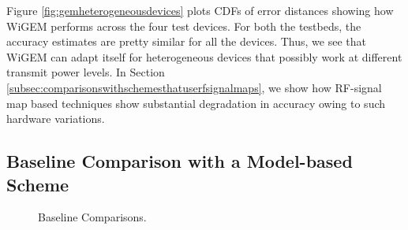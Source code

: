 
Figure \ref{fig:gemheterogeneousdevices} plots CDFs of error distances showing how WiGEM performs across the four test devices. %
For both the testbeds, the accuracy estimates are pretty similar for all the devices. Thus, we see that WiGEM can adapt itself for heterogeneous devices that possibly work at different transmit power levels. In Section \ref{subsec:comparisonswithschemesthatuserfsignalmaps}, we show how RF-signal map based techniques show substantial degradation in accuracy owing to such hardware variations. 

\subsection{Baseline Comparison with a Model-based Scheme}
\label{subsec:baselinecomparisonwithamodelbasedscheme}

\begin{figure}[h!]
	\centering
	\caption{Baseline Comparisons.}
	\label{fig:baselinecomparisons}
\end{figure}


